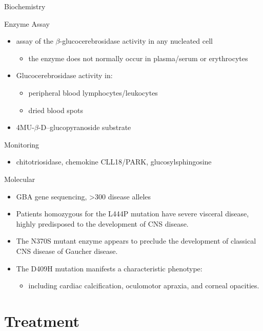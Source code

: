 \documentclass[presentation, smaller]{beamer}
\begin{document}
\begin{frame}[label={sec:orgheadline15}]{Biochemistry}
\begin{block}{Enzyme Assay}
\begin{itemize}
\item assay of the \(\beta\)-glucocerebrosidase activity in any nucleated cell
\begin{itemize}
\item the enzyme does not normally occur in plasma/serum or erythrocytes
\end{itemize}
\item Glucocerebrosidase activity in:
\begin{itemize}
\item peripheral blood lymphocytes/leukocytes
\item dried blood spots
\end{itemize}
\item 4MU-\(\beta\)-D--glucopyranoside substrate
\end{itemize}
\end{block}

\begin{block}{Monitoring}
\begin{itemize}
\item chitotriosidase, chemokine CLL18/PARK, glucosylsphingosine
\end{itemize}
\end{block}
\end{frame}

\begin{frame}[label={sec:orgheadline16}]{Molecular}
\begin{itemize}
\item GBA gene sequencing, >300 disease alleles
\item Patients homozygous for the L444P mutation have severe visceral
disease, highly predisposed to the development of CNS disease.
\item The N370S mutant enzyme appears to preclude the development of classical CNS disease of Gaucher disease.
\item The D409H mutation manifests a characteristic phenotype:
\begin{itemize}
\item including cardiac calcification, oculomotor apraxia, and corneal opacities.
\end{itemize}
\end{itemize}
\end{frame}


\section{Treatment}
\label{sec:orgheadline18}
\end{document}

